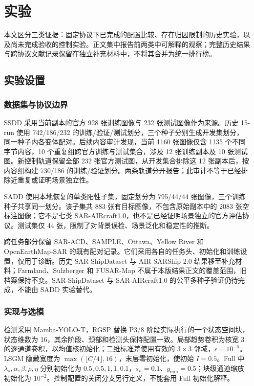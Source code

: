 \section{实验}\label{sec:experiments}
本文区分三类证据：固定协议下已完成的配置比较、存在归因限制的历史实验，以及尚未完成验收的控制实验。正文集中报告前两类中可解释的观察；完整历史结果与跨协议文献记录保留在独立补充材料中，不将其合并为统一排行榜。

\subsection{实验设置}\label{sec:experimental_settings}
\subsubsection{数据集与协议边界}
SSDD 采用当前副本的官方 928 张训练图像与 232 张测试图像作为来源\cite{ssdd2017,ssdd2021}。历史 15-run 使用 742/186/232 的训练/验证/测试划分，三个种子分别生成开发集划分，同一种子内各变体配对。后续内容审计发现，当前 1160 张图像仅含 1135 个不同字节内容，10 个重复组跨官方训练与测试集合，涉及 12 张训练副本及 10 张测试图。新控制轨道保留全部 232 张官方测试图，从开发集合排除这 12 张副本后，按内容组构建 730/186 的训练/验证划分。两条轨道分开报告；此审计不等于已经排除近重复或证明场景独立性。

SADD 使用本地恢复的单类阳性子集，固定划分为 795/44/44 张图像，三个训练种子共享同一划分。该子集共 883 张有目标图像，不包含原始副本中的 2083 张空标注图像；它不是七类 SAR-AIRcraft1.0，也不是已经证明场景独立的官方评估协议。测试集仅 44 张，限制了对背景误检、场景泛化和稳定性的推断。

跨任务部分保留 SAR-ACD、SAMPLE、Ottawa、Yellow River 和 OpenEarthMap-SAR 的既有配对记录。它们采用各自的任务头、初始化和训练设置，仅用于诊断。历史 SAR-ShipDataset 与 AIR-SARShip-2.0 结果移至补充材料；Farmland、Sulzberger 和 FUSAR-Map 不属于本版结果正文的覆盖范围，旧档案保持不变。SAR-ShipDataset 与 SAR-AIRcraft1.0 的公平多种子验证仍待完成，不能由 SADD 实验替代。

\subsubsection{实现与选模}
检测采用 Mamba-YOLO-T，RGSP 替换 P3/8 阶段实际执行的一个状态空间块，状态维数为 16，其余阶段、颈部和检测头保持配置一致。局部趋势卷积为核宽 3 的逐通道卷积，以均值核初始化；二维标准差使用有效的 $3\times3$ 邻域，$\epsilon=10^{-5}$。LSGM 隐藏宽度为 $\max(\lfloor C/4\rfloor,16)$，末层零初始化，使初始 $I=0.5$。Full 中 $\lambda_s,\alpha,\beta,\rho,\eta$ 分别初始化为 $0.5,0.5,1,1,0.1$，$s_n=0.1$、$g_{\min}=0.5$；块级通道缩放初始化为 $10^{-2}$。控制配置的关闭分支另行定义，不能套用 Full 初始化解释。

